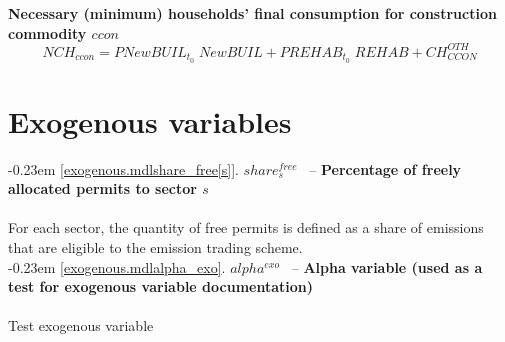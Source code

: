 \documentclass[12pt]{article}
\numberwithin{equation}{section}
\begin{document}
\noindent \textbf{Necessary (minimum) households' final consumption for construction commodity $ccon$} 
\begin{dmath}
NCH_{ccon}  = PNewBUIL_{t_0} \; NewBUIL + PREHAB_{t_0} \; REHAB + CH^{OTH}_{CCON} 
\label{ETS.mdlNCH[ccon]}
\end{dmath}
\newpage\section{Exogenous variables}



\noindent \kern-0.23em \noindent \begingroup {} \label{exogenous.mdlshare_free[s]}\ref{exogenous.mdlshare_free[s]}.
         
        \ensuremath{share^{free}_{s}}~ \endgroup -- \noindent \textbf{Percentage of freely allocated permits to sector $s$}  \\ \\[-8pt]For each sector, the quantity of free permits is defined as a share of emissions that are eligible to the emission trading scheme. \\




\noindent \kern-0.23em \noindent \begingroup {} \label{exogenous.mdlalpha_exo}\ref{exogenous.mdlalpha_exo}.
         
        \ensuremath{alpha^{exo}}~ \endgroup -- \noindent \textbf{Alpha variable (used as a test for exogenous variable documentation)}  \\ \\[-8pt]Test exogenous variable
\newpage
\end{document}
